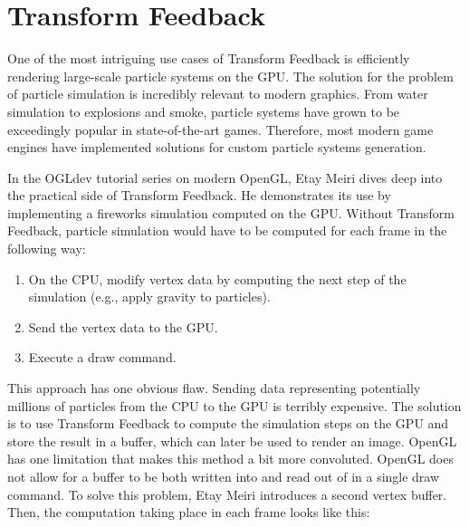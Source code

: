 \documentclass[
  digital,     %
  oneside,     %
  nosansbold,  %
  nocolorbold, %
  lof,         %
  lot,         %
]{fithesis4}
\begin{document}
\chapter{Transform Feedback}\label{app:transform-feedback}
One of the most intriguing use cases of Transform Feedback is efficiently rendering large-scale particle systems on the GPU.
The solution for the problem of particle simulation is incredibly relevant to modern graphics. From water simulation
to explosions and smoke, particle systems have grown to be exceedingly popular in state-of-the-art games. Therefore,
most modern game engines have implemented solutions for custom particle systems generation.

In the OGLdev tutorial series on modern OpenGL, Etay Meiri \cite{ogl-particle-system} dives deep into the practical
side of Transform Feedback. He demonstrates its use by implementing a fireworks simulation computed on the GPU.
Without Transform Feedback, particle simulation would have to be computed for each frame in the following way:
\begin{enumerate}
    \item On the CPU, modify vertex data by computing the next step of the simulation (e.g., apply gravity to particles).
    \item Send the vertex data to the GPU.
    \item Execute a draw command.
\end{enumerate}
This approach has one obvious flaw. Sending data representing potentially millions of particles from the CPU to the GPU
is terribly expensive. The solution is to use Transform Feedback to compute the simulation steps on the GPU and store
the result in a buffer, which can later be used to render an image. OpenGL has one limitation that makes this method
a bit more convoluted. OpenGL does not allow for a buffer to be both written into and read out of in a single draw command.
To solve this problem, Etay Meiri \cite{ogl-particle-system} introduces a second vertex buffer.
Then, the computation taking place in each frame looks like this:
\end{document}
